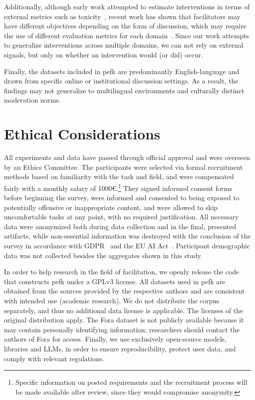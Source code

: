 \documentclass[11pt]{article}
\theoremstyle{definition}
\theoremstyle{plain}
\begin{document}
Additionally, although early work attempted to estimate interventions in terms of external metrics such as toxicity~\citep{wikiconv, cmv_awry2,Yuan_Singh_2023}, recent work has shown that facilitators may have different objectives depending on the form of discussion, which may require the use of different evaluation metrics for each domain~\citep{korre-etal-2025-evaluation}. Since our work attempts to generalize interventions across multiple domains, we can not rely on external signals, but only on whether an intervention would (or did) occur. 

Finally, the datasets included in \ac{pefk} are predominantly English-language and drawn from specific online or institutional discussion settings. As a result, the findings may not generalize to multilingual environments and culturally distinct moderation norms.


\section*{Ethical Considerations}
All experiments and data have passed through official approval and were overseen by an Ethics Committee. The participants were selected via formal recruitment methods based on familiarity with the task and field, and were compensated fairly with a monthly salary of 1000€.\footnote{Specific information on posted requirements and the recruitment process will be made available after review, since they would compromise anonymity.} They signed informed consent forms before beginning the survey, were informed and consented to being exposed to potentially offensive or inappropriate content, and were allowed to skip uncomfortable tasks at any point, with no required justification. All necessary data were anonymized both during data collection and in the final, presented artifacts, while non-essential information was destroyed with the conclusion of the survey in accordance with GDPR~\citep{GDPR} and the EU AI Act~\citep{eu_ai_act}. Participant demographic data was not collected besides the aggregates shown in this study.

In order to help research in the field of facilitation, we openly release the code that constructs \ac{pefk} under a GPLv3 license. All datasets used in \ac{pefk} are obtained from the sources provided by the respective authors and are consistent with intended use (academic research). We do not distribute the corpus separately, and thus no additional data license is applicable. The licenses of the original distribution apply. The Fora dataset \citep{schroeder-etal-2024-fora} is not publicly available because it may contain personally identifying information; researchers should contact the authors of Fora for access. Finally, we use exclusively open-source models, libraries and LLMs, in order to ensure reproducibility, protect user data, and comply with relevant regulations.
\end{document}
